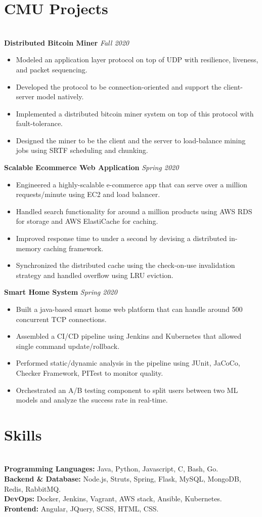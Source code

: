 \documentclass{resume}
\begin{document}
\section*{CMU Projects}
\titlerule
\noindent
\\
\textbf{Distributed Bitcoin Miner} \hfill \textit{Fall 2020}
\begin{itemize}
  \item Modeled an application layer protocol on top of UDP with resilience, liveness, and packet sequencing.
  \item Developed the protocol to be connection-oriented and support the client-server model natively.
  \item Implemented a distributed bitcoin miner system on top of this protocol with fault-tolerance.
  \item Designed the miner to be the client and the server to load-balance mining jobs using SRTF scheduling and chunking.
\end{itemize}
\textbf{Scalable Ecommerce Web Application} \hfill \textit{Spring 2020}
\begin{itemize}
  \item Engineered a highly-scalable e-commerce app that can serve over a million requests/minute using EC2 and load balancer.
  \item Handled search functionality for around a million products using AWS RDS for storage and AWS ElastiCache for caching.
  \item Improved response time to under a second by devising a distributed in-memory caching framework.
  \item Synchronized the distributed cache using the check-on-use invalidation strategy and handled overflow using LRU eviction.
\end{itemize}
\textbf{Smart Home System} \hfill \textit{Spring 2020}
\begin{itemize}
  \item Built a java-based smart home web platform that can handle around 500 concurrent TCP connections.
  \item Assembled a CI/CD pipeline using Jenkins and Kubernetes that allowed single command update/rollback.
  \item Performed static/dynamic analysis in the pipeline using JUnit, JaCoCo, Checker Framework, PITest to monitor quality.
  \item Orchestrated an A/B testing component to split users between two ML models and analyze the success rate in real-time.
\end{itemize}
\section*{Skills}
\titlerule
\noindent
\\
\textbf{Programming Languages:} Java, Python, Javascript, C, Bash, Go. \\
\textbf{Backend \& Database:} Node.js, Struts, Spring, Flask, MySQL, MongoDB, Redis, RabbitMQ. \\
\textbf{DevOps:} Docker, Jenkins, Vagrant, AWS stack, Ansible, Kubernetes. \\
\textbf{Frontend:} Angular, JQuery, SCSS, HTML, CSS.
\end{document}
